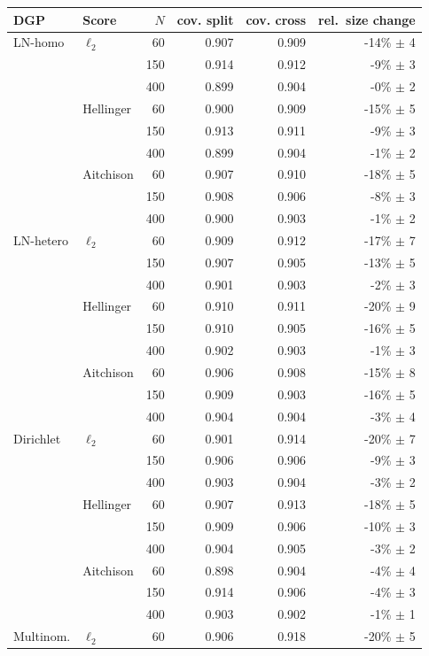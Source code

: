 \begin{tabular}{llrrrr}
\toprule
DGP & Score & $N$ & cov. split & cov. cross & rel.\ size change \\
\midrule
LN-homo & $\ell_2$ & 60 & 0.907 & 0.909 & -14\% $\pm$ 4 \\
 &  & 150 & 0.914 & 0.912 & -9\% $\pm$ 3 \\
 &  & 400 & 0.899 & 0.904 & -0\% $\pm$ 2 \\
 & Hellinger & 60 & 0.900 & 0.909 & -15\% $\pm$ 5 \\
 &  & 150 & 0.913 & 0.911 & -9\% $\pm$ 3 \\
 &  & 400 & 0.899 & 0.904 & -1\% $\pm$ 2 \\
 & Aitchison & 60 & 0.907 & 0.910 & -18\% $\pm$ 5 \\
 &  & 150 & 0.908 & 0.906 & -8\% $\pm$ 3 \\
 &  & 400 & 0.900 & 0.903 & -1\% $\pm$ 2 \\
\midrule
LN-hetero & $\ell_2$ & 60 & 0.909 & 0.912 & -17\% $\pm$ 7 \\
 &  & 150 & 0.907 & 0.905 & -13\% $\pm$ 5 \\
 &  & 400 & 0.901 & 0.903 & -2\% $\pm$ 3 \\
 & Hellinger & 60 & 0.910 & 0.911 & -20\% $\pm$ 9 \\
 &  & 150 & 0.910 & 0.905 & -16\% $\pm$ 5 \\
 &  & 400 & 0.902 & 0.903 & -1\% $\pm$ 3 \\
 & Aitchison & 60 & 0.906 & 0.908 & -15\% $\pm$ 8 \\
 &  & 150 & 0.909 & 0.903 & -16\% $\pm$ 5 \\
 &  & 400 & 0.904 & 0.904 & -3\% $\pm$ 4 \\
\midrule
Dirichlet & $\ell_2$ & 60 & 0.901 & 0.914 & -20\% $\pm$ 7 \\
 &  & 150 & 0.906 & 0.906 & -9\% $\pm$ 3 \\
 &  & 400 & 0.903 & 0.904 & -3\% $\pm$ 2 \\
 & Hellinger & 60 & 0.907 & 0.913 & -18\% $\pm$ 5 \\
 &  & 150 & 0.909 & 0.906 & -10\% $\pm$ 3 \\
 &  & 400 & 0.904 & 0.905 & -3\% $\pm$ 2 \\
 & Aitchison & 60 & 0.898 & 0.904 & -4\% $\pm$ 4 \\
 &  & 150 & 0.914 & 0.906 & -4\% $\pm$ 3 \\
 &  & 400 & 0.903 & 0.902 & -1\% $\pm$ 1 \\
\midrule
Multinom. & $\ell_2$ & 60 & 0.906 & 0.918 & -20\% $\pm$ 5 \\

\end{tabular}
